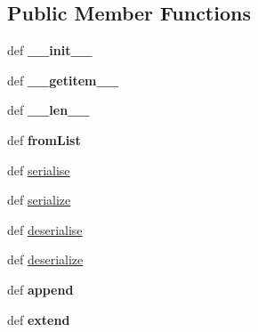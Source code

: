 \subsection*{Public Member Functions}
\begin{DoxyCompactItemize}
\item 
\hypertarget{classcheshire3_1_1result_set_1_1_simple_result_set_af4a28b8ce932140190ac88dbcd78841e}{def {\bfseries \-\_\-\-\_\-init\-\_\-\-\_\-}}\label{classcheshire3_1_1result_set_1_1_simple_result_set_af4a28b8ce932140190ac88dbcd78841e}

\item 
\hypertarget{classcheshire3_1_1result_set_1_1_simple_result_set_aa8818b4b2565d08dbaf84f28d354d119}{def {\bfseries \-\_\-\-\_\-getitem\-\_\-\-\_\-}}\label{classcheshire3_1_1result_set_1_1_simple_result_set_aa8818b4b2565d08dbaf84f28d354d119}

\item 
\hypertarget{classcheshire3_1_1result_set_1_1_simple_result_set_abc3621c0fa2a70379d73e656d86b1b3a}{def {\bfseries \-\_\-\-\_\-len\-\_\-\-\_\-}}\label{classcheshire3_1_1result_set_1_1_simple_result_set_abc3621c0fa2a70379d73e656d86b1b3a}

\item 
\hypertarget{classcheshire3_1_1result_set_1_1_simple_result_set_a809b3879835e621dbe6fb6b81a0f9503}{def {\bfseries from\-List}}\label{classcheshire3_1_1result_set_1_1_simple_result_set_a809b3879835e621dbe6fb6b81a0f9503}

\item 
def \hyperlink{classcheshire3_1_1result_set_1_1_simple_result_set_ab037ba835c7801fa6bc0664559370f1d}{serialise}
\item 
def \hyperlink{classcheshire3_1_1result_set_1_1_simple_result_set_a8b0f8b88b2efaec7f3e541a8b95e69fd}{serialize}
\item 
def \hyperlink{classcheshire3_1_1result_set_1_1_simple_result_set_abd9f3e3ff43d184c24867bb6df95267e}{deserialise}
\item 
def \hyperlink{classcheshire3_1_1result_set_1_1_simple_result_set_aa860940ef0fe10c2ff32adabc15692c2}{deserialize}
\item 
\hypertarget{classcheshire3_1_1result_set_1_1_simple_result_set_ae398e8b91a0eee976e925f0200c4be46}{def {\bfseries append}}\label{classcheshire3_1_1result_set_1_1_simple_result_set_ae398e8b91a0eee976e925f0200c4be46}

\item 
\hypertarget{classcheshire3_1_1result_set_1_1_simple_result_set_aad1b39be2d9c37a712dd1a54ddf9a8de}{def {\bfseries extend}}\label{classcheshire3_1_1result_set_1_1_simple_result_set_aad1b39be2d9c37a712dd1a54ddf9a8de}


\end{DoxyCompactItemize}
